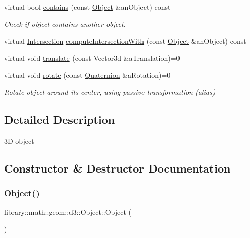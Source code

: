 \begin{DoxyCompactItemize}
virtual bool \hyperlink{classlibrary_1_1math_1_1geom_1_1d3_1_1_object_abaf45bf02ca165ba7bf685b24f5f97ef}{contains} (const \hyperlink{classlibrary_1_1math_1_1geom_1_1d3_1_1_object}{Object} \&an\+Object) const
\begin{DoxyCompactList}\small\item\em Check if object contains another object. \end{DoxyCompactList}\item 
virtual \hyperlink{classlibrary_1_1math_1_1geom_1_1d3_1_1_intersection}{Intersection} \hyperlink{classlibrary_1_1math_1_1geom_1_1d3_1_1_object_ad0e609afe46a20412d8dbff6e0214203}{compute\+Intersection\+With} (const \hyperlink{classlibrary_1_1math_1_1geom_1_1d3_1_1_object}{Object} \&an\+Object) const
\item 
virtual void \hyperlink{classlibrary_1_1math_1_1geom_1_1d3_1_1_object_a989723a27a7d5f6739e45ea695a6c7ed}{translate} (const Vector3d \&a\+Translation)=0
\item 
virtual void \hyperlink{classlibrary_1_1math_1_1geom_1_1d3_1_1_object_aabefebc4960530ce6356c4445c5d490e}{rotate} (const \hyperlink{classlibrary_1_1math_1_1geom_1_1trf_1_1rot_1_1_quaternion}{Quaternion} \&a\+Rotation)=0
\begin{DoxyCompactList}\small\item\em Rotate object around its center, using passive transformation (alias) \end{DoxyCompactList}\end{DoxyCompactItemize}


\subsection{Detailed Description}
3D object 

\subsection{Constructor \& Destructor Documentation}
\mbox{\label{classlibrary_1_1math_1_1geom_1_1d3_1_1_object_ab484354bbce44290b6d288c7825d9e42}} 
\subsubsection{\texorpdfstring{Object()}{Object()}}
{\footnotesize\ttfamily library\+::math\+::geom\+::d3\+::\+Object\+::\+Object (\begin{DoxyParamCaption}{ }\end{DoxyParamCaption})\hspace{0.3cm}{\ttfamily [default]}}



